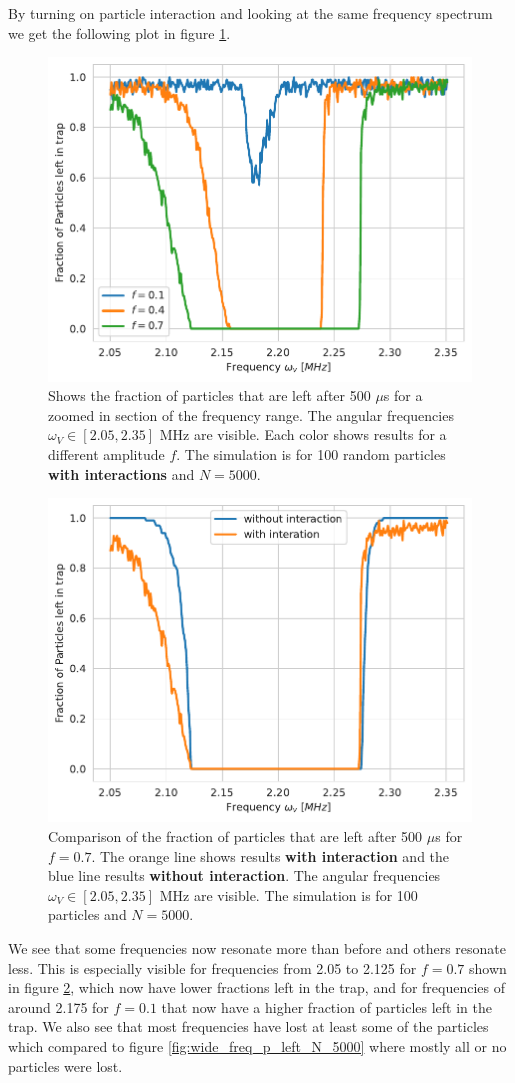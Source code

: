 \documentclass[english,notitlepage,reprint,nofootinbib]{revtex4-1}  %
\begin{document}
By turning on particle interaction and looking at the same frequency spectrum we get the following plot in figure \ref{fig:narrow_freq_p_left_N_5000_interaction_zoom}.
\begin{figure}[H]
    \centering
    \includegraphics[width=.5\textwidth]{../figures/narrow_freq_p_left_N_5000_interaction_zoom.pdf}
    \caption{Shows the fraction of particles that are left after 500 $\mu$s for a zoomed in section of the frequency range. The angular frequencies $\omega_V \in [2.05,2.35]$ MHz are visible. Each color shows results for a different amplitude $f$. The simulation is for 100 random particles \textbf{with interactions} and $N = 5000$.}
    \label{fig:narrow_freq_p_left_N_5000_interaction_zoom}
\end{figure}
\begin{figure}[H]
    \centering
    \includegraphics[width=.5\textwidth]{../figures/narrow_freq_p_left_N_5000_zoom_compare.pdf}
    \caption{Comparison of the fraction of particles that are left after 500 $\mu$s for $f = 0.7$. The orange line shows results \textbf{with interaction} and the blue line results \textbf{without interaction}. The angular frequencies $\omega_V \in [2.05,2.35]$ MHz are visible. The simulation is for 100 particles and $N = 5000$.}
    \label{fig:narrow_freq_p_left_N_5000_zoom_compare}
\end{figure}
We see that some frequencies now resonate more than before and others resonate less. This is especially visible for frequencies from 2.05 to 2.125 for $f=0.7$ shown in figure \ref{fig:narrow_freq_p_left_N_5000_zoom_compare}, which now have lower fractions left in the trap, and for frequencies of around 2.175 for $f=0.1$ that now have a higher fraction of particles left in the trap. We also see that most frequencies have lost at least some of the particles which compared to figure \ref{fig:wide_freq_p_left_N_5000} where mostly all or no particles were lost.
\end{document}
